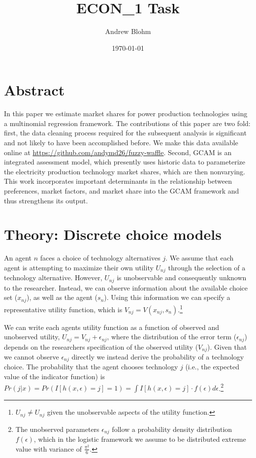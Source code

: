 \documentclass[10pt]{amsart}
\title{ECON\_1 Task}
\author{Andrew Blohm}
\date{\today}
\begin{document}
\maketitle

\section{Abstract}
In this paper we estimate market shares for power production technologies using a multinomial regression framework. 
The contributions of this paper are two fold: first, the data cleaning process required for the subsequent analysis is significant and not likely to have been accomplished before.
We make this data available online at \url{https://github.com/andymd26/fuzzy-waffle}. 
Second, GCAM is an integrated assessment model, which presently uses historic data to parameterize the electricity production technology market shares, which are then nonvarying. 
This work incorporates important determinants in the relationship between preferences, market factors, and market share into the GCAM framework and thus strengthens its output.  

\section{Theory: Discrete choice models}
An agent $n$ faces a choice of technology alternatives $j$.  
We assume that each agent is attempting to maximize their own utility $U_{nj}$ through the selection of a technology alternative.
However, $U_{nj}$ is unobservable and consequently unknown to the researcher.
Instead, we can observe information about the available choice set ($x_{nj}$), as well as the agent ($s_{n}$).
Using this information we can specify a representative utility function, which is $V_{nj} = V(x_{nj}, s_{n})$.\footnote{$U_{nj} \neq U_{nj}$ given the unobservable aspects of the utility function.} 

We can write each agents utility function as a function of observed and unobserved utility, $U_{nj} = V_{nj} + \epsilon_{nj}$, where the distribution of the error term ($\epsilon_{nj}$) depends on the researchers specification of the observed utility ($V_{nj}$). 
Given that we cannot observe $\epsilon_{nj}$ directly we instead derive the probability of a technology choice. 
The probability that the agent chooses technology $j$ (i.e., the expected value of the indicator function) is $Pr(j \vert x) = Pr(I[h(x, \epsilon) = j] = 1) = \int I[h(x, \epsilon) = j]\cdot f(\epsilon) d\epsilon$.\footnote{The unobserved parameters $\epsilon_{nj}$ follow a probability density distribution $f(\epsilon)$, which in the logistic framework we assume to be distributed extreme value with variance of $\frac{\pi^2}{6}$.}
\end{document}
